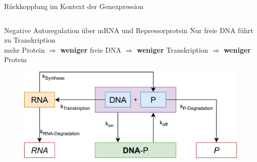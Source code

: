 \documentclass[11pt,aspectratio=169,reqno]{beamer}
\begin{document}
\begin{frame}{Rückkopplung im Kontext der Genexpression}
\begin{columns}
    
\end{columns}
\end{frame}

\begin{frame}{Negative Autoregulation über mRNA und Repressorprotein}
    \centering Nur freie DNA führt zu Transkription\\[1em]
    mehr Protein $\Rightarrow$ \textbf{weniger} freie DNA $\Rightarrow$ \textbf{weniger} Transkription $\Rightarrow$ \textbf{weniger} Protein

    \vspace{2em}

    \begin{figure}
        \centering
        \includegraphics[width=.6\textwidth]{images/negative_autoregulation_overview.png}
    \end{figure}
\end{frame}
\end{document}
